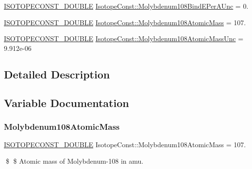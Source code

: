 \begin{DoxyCompactItemize}
\item 
\mbox{\hyperlink{group___isotope_const-_macros_ga8f45a7272ce02c0b4c65c44636ed719a}{I\+S\+O\+T\+O\+P\+E\+C\+O\+N\+S\+T\+\_\+\+D\+O\+U\+B\+LE}} \mbox{\hyperlink{group___isotope_const-_molybdenum-_mo108_gafaf1206a5f34c6e0edf30873254211c0}{Isotope\+Const\+::\+Molybdenum108\+Bind\+E\+Per\+A\+Unc}} = 0.
\item 
\mbox{\hyperlink{group___isotope_const-_macros_ga8f45a7272ce02c0b4c65c44636ed719a}{I\+S\+O\+T\+O\+P\+E\+C\+O\+N\+S\+T\+\_\+\+D\+O\+U\+B\+LE}} \mbox{\hyperlink{group___isotope_const-_molybdenum-_mo108_gae34b4016df4f4ad5f5a28f4b56afc8d1}{Isotope\+Const\+::\+Molybdenum108\+Atomic\+Mass}} = 107.
\item 
\mbox{\hyperlink{group___isotope_const-_macros_ga8f45a7272ce02c0b4c65c44636ed719a}{I\+S\+O\+T\+O\+P\+E\+C\+O\+N\+S\+T\+\_\+\+D\+O\+U\+B\+LE}} \mbox{\hyperlink{group___isotope_const-_molybdenum-_mo108_ga615598dc6e8339d8513ce5bf33792813}{Isotope\+Const\+::\+Molybdenum108\+Atomic\+Mass\+Unc}} = 9.\+912e-\/06
\end{DoxyCompactItemize}


\subsection{Detailed Description}


\subsection{Variable Documentation}
\mbox{\label{group___isotope_const-_molybdenum-_mo108_gae34b4016df4f4ad5f5a28f4b56afc8d1}} 
\subsubsection{\texorpdfstring{Molybdenum108\+Atomic\+Mass}{Molybdenum108AtomicMass}}
{\footnotesize\ttfamily \mbox{\hyperlink{group___isotope_const-_macros_ga8f45a7272ce02c0b4c65c44636ed719a}{I\+S\+O\+T\+O\+P\+E\+C\+O\+N\+S\+T\+\_\+\+D\+O\+U\+B\+LE}} Isotope\+Const\+::\+Molybdenum108\+Atomic\+Mass = 107.}

\$ \$ Atomic mass of Molybdenum-\/108 in amu. \mbox{\label{group___isotope_const-_molybdenum-_mo108_ga615598dc6e8339d8513ce5bf33792813}} 

